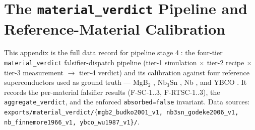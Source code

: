 \section{The \texttt{material\_verdict} Pipeline and Reference-Material Calibration}
\label{app:material}

This appendix is the full data record for pipeline stage
\textcircled{\scriptsize 4}: the four-tier \texttt{material\_verdict}
falsifier-dispatch pipeline (tier-1 simulation $\times$ tier-2 recipe
$\times$ tier-3 measurement $\to$ tier-4 verdict) and its calibration
against four reference superconductors used as ground truth --- MgB$_2$
\citep{nagamatsu2001,budko2001}, Nb$_3$Sn \citep{godeke2006}, Nb
\citep{finnemore1966}, and YBCO \citep{wu1987}. It records the per-material
falsifier results (F-SC-1..3, F-RTSC-1..3), the
\texttt{aggregate\_verdict}, and the enforced \texttt{absorbed=false}
invariant. Data sources:
\texttt{exports/material\_verdict/\{mgb2\_budko2001\_v1,
nb3sn\_godeke2006\_v1, nb\_finnemore1966\_v1, ybco\_wu1987\_v1\}/}.

